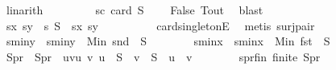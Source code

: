 \begin{isabellebody}
\ linarith\isanewline
\ \ \ \ \ \ \isamarkupfalse%
\ \ s{}{\isacharunderscore}{\kern0pt}c{}{\isacharcolon}{\kern0pt}\ {\isachardoublequoteopen}card\ S{}\ {\isacharequal}{\kern0pt}\ {}{\isachardoublequoteclose}\ \isamarkupfalse%
\ False\ Tout\ \isamarkupfalse%
\ blast\isanewline
\ \ \ \ \ \ \isamarkupfalse%
\ \isamarkupfalse%
\ s{}x\ s{}y\ \ s{}{\isacharcolon}{\kern0pt}\ {\isachardoublequoteopen}S{}\ {\isacharequal}{\kern0pt}\ {\isacharbraceleft}{\kern0pt}{\isacharparenleft}{\kern0pt}s{}x{\isacharcomma}{\kern0pt}\ s{}y{\isacharparenright}{\kern0pt}{\isacharbraceright}{\kern0pt}{\isachardoublequoteclose}\isanewline
\ \ \ \ \ \ \ \ \isamarkupfalse%
\ card{\isacharunderscore}{\kern0pt}{}{\isacharunderscore}{\kern0pt}singletonE\ \isamarkupfalse%
\ {\isacharparenleft}{\kern0pt}metis\ surj{\isacharunderscore}{\kern0pt}pair{\isacharparenright}{\kern0pt}\isanewline
\isanewline
\ \ \ \ \ \ \isamarkupfalse%
\ s{}{\isacharunderscore}{\kern0pt}miny\ \ {\isachardoublequoteopen}s{}{\isacharunderscore}{\kern0pt}miny\ {\isacharequal}{\kern0pt}\ Min\ {\isacharparenleft}{\kern0pt}snd\ {\isacharbackquote}{\kern0pt}\ S{}{\isacharparenright}{\kern0pt}{\isachardoublequoteclose}\isanewline
\ \ \ \ \ \ \isamarkupfalse%
\ s{}{\isacharunderscore}{\kern0pt}minx\ \ {\isachardoublequoteopen}s{}{\isacharunderscore}{\kern0pt}minx\ {\isacharequal}{\kern0pt}\ Min\ {\isacharparenleft}{\kern0pt}fst\ {\isacharbackquote}{\kern0pt}\ S{}{\isacharparenright}{\kern0pt}{\isachardoublequoteclose}\isanewline
\ \ \ \ \ \ \isamarkupfalse%
\ S{}pr\ \ {\isachardoublequoteopen}S{}pr\ {\isacharequal}{\kern0pt}\ {\isacharbraceleft}{\kern0pt}{\isacharparenleft}{\kern0pt}u{\isacharcomma}{\kern0pt}v{\isacharparenright}{\kern0pt}{\isacharbar}{\kern0pt}u\ v{\isachardot}{\kern0pt}\ u\ {\isasymin}\ S{}\ {\isasymand}\ v\ {\isasymin}\ S{}\ {\isasymand}\ u\ {\isacharless}{\kern0pt}\ v{\isacharbraceright}{\kern0pt}{\isachardoublequoteclose}\isanewline
\isanewline
\ \ \ \ \ \ \isamarkupfalse%
\ s{}pr{\isacharunderscore}{\kern0pt}fin{\isacharcolon}{\kern0pt}\ {\isachardoublequoteopen}finite\ S{}pr{\isachardoublequoteclose}\ \isamarkupfalse%

\end{isabellebody}
